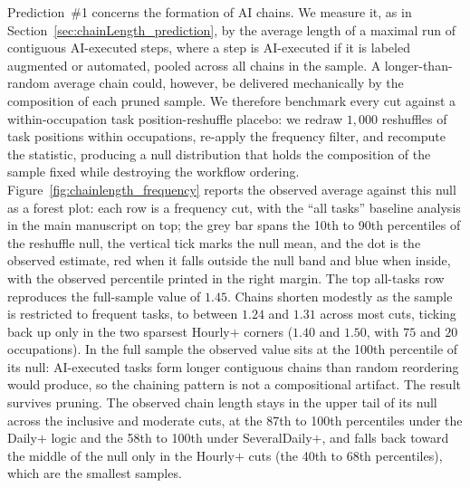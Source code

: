 Prediction~\#1 concerns the formation of AI chains.
We measure it, as in Section~\ref{sec:chainLength_prediction}, by the average length of a maximal run of contiguous AI-executed steps, where a step is AI-executed if it is labeled augmented or automated, pooled across all chains in the sample.
A longer-than-random average chain could, however, be delivered mechanically by the composition of each pruned sample.
We therefore benchmark every cut against a within-occupation task position-reshuffle placebo: we redraw $1{,}000$ reshuffles of task positions within occupations, re-apply the frequency filter, and recompute the statistic, producing a null distribution that holds the composition of the sample fixed while destroying the workflow ordering.
Figure~\ref{fig:chainlength_frequency} reports the observed average against this null as a forest plot: each row is a frequency cut, with the ``all tasks'' baseline analysis in the main manuscript on top; the grey bar spans the 10th to 90th percentiles of the reshuffle null, the vertical tick marks the null mean, and the dot is the observed estimate, red when it falls outside the null band and blue when inside, with the observed percentile printed in the right margin.
The top all-tasks row reproduces the full-sample value of $1.45$.
Chains shorten modestly as the sample is restricted to frequent tasks, to between $1.24$ and $1.31$ across most cuts, ticking back up only in the two sparsest Hourly$+$ corners ($1.40$ and $1.50$, with $75$ and $20$ occupations).
In the full sample the observed value sits at the 100th percentile of its null: AI-executed tasks form longer contiguous chains than random reordering would produce, so the chaining pattern is not a compositional artifact.
The result survives pruning.
The observed chain length stays in the upper tail of its null across the inclusive and moderate cuts, at the 87th to 100th percentiles under the Daily$+$ logic and the 58th to 100th under SeveralDaily$+$, and falls back toward the middle of the null only in the Hourly$+$ cuts (the 40th to 68th percentiles), which are the smallest samples.

